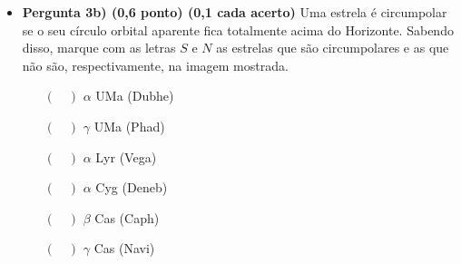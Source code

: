 \documentclass[a4paper, 12pt]{article}
\begin{document}
\begin{flushleft}
\begin{itemize}
\begin{itemize}
				\item \textbf{Pergunta 3b) (0,6 ponto) (0,1 cada acerto)} Uma estrela é circumpolar se o seu círculo orbital aparente fica totalmente acima do Horizonte. Sabendo disso, marque com as letras $S$ e $N$ as estrelas que são circumpolares e as que não são, respectivamente, na imagem mostrada.
					\begin{multicols}{3} \begin{itemize}
						\item[$(\quad)$] $\alpha$ UMa (Dubhe)
						\item[$(\quad)$] $\gamma$ UMa (Phad)
						\item[$(\quad)$] $\alpha$ Lyr (Vega)
						\item[$(\quad)$] $\alpha$ Cyg (Deneb)
						\item[$(\quad)$] $\beta$ Cas (Caph)
						\item[$(\quad)$] $\gamma$ Cas (Navi)
					\end{itemize} \end{multicols}
			\end{itemize}
			

\end{itemize}
\end{flushleft}
\end{document}
